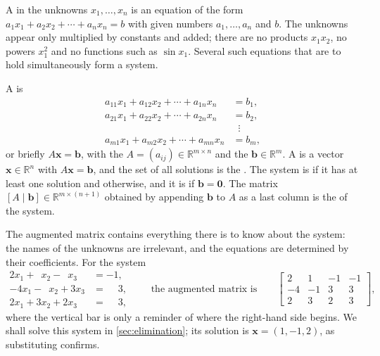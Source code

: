 A  in the unknowns $x_1,\ldots,x_n$ is an equation of the form $a_1x_1+a_2x_2+\cdots+a_nx_n=b$ with given numbers $a_1,\ldots,a_n$ and $b$. The unknowns appear only multiplied by constants and added; there are no products $x_1x_2$, no powers $x_1^2$ and no functions such as $\sin x_1$. Several such equations that are to hold simultaneously form a system.

\begin{definition}
\label{def:linear-system}
A  is
\[
\begin{aligned}
a_{11}x_1+a_{12}x_2+\cdots+a_{1n}x_n&=b_1,\\
a_{21}x_1+a_{22}x_2+\cdots+a_{2n}x_n&=b_2,\\
&\;\;\vdots\\
a_{m1}x_1+a_{m2}x_2+\cdots+a_{mn}x_n&=b_m,
\end{aligned}
\]
or briefly $A\mathbf x=\mathbf b$, with the  $A=(a_{ij})\in\mathbb R^{m\times n}$ and the  $\mathbf b\in\mathbb R^m$. A  is a vector $\mathbf x\in\mathbb R^n$ with $A\mathbf x=\mathbf b$, and the set of all solutions is the . The system is  if it has at least one solution and  otherwise, and it is  if $\mathbf b=\mathbf 0$. The matrix $[A\mid\mathbf b]\in\mathbb R^{m\times(n+1)}$ obtained by appending $\mathbf b$ to $A$ as a last column is the  of the system.
\end{definition}

The augmented matrix contains everything there is to know about the system: the names of the unknowns are irrelevant, and the equations are determined by their coefficients. For the system
\begin{equation}
\begin{aligned}
2x_1+\phantom{3}x_2-\phantom{2}x_3&=-1,\\
-4x_1-\phantom{3}x_2+3x_3&=\phantom{-}3,\\
2x_1+3x_2+2x_3&=\phantom{-}3,
\end{aligned}
\qquad\text{the augmented matrix is}\qquad
\left[\begin{array}{rrr|r}2&1&-1&-1\\-4&-1&3&3\\2&3&2&3\end{array}\right],
\label{eq:example-system}
\end{equation}
where the vertical bar is only a reminder of where the right-hand side begins. We shall solve this system in \cref{sec:elimination}; its solution is $\mathbf x=(1,-1,2)$, as substituting confirms.

